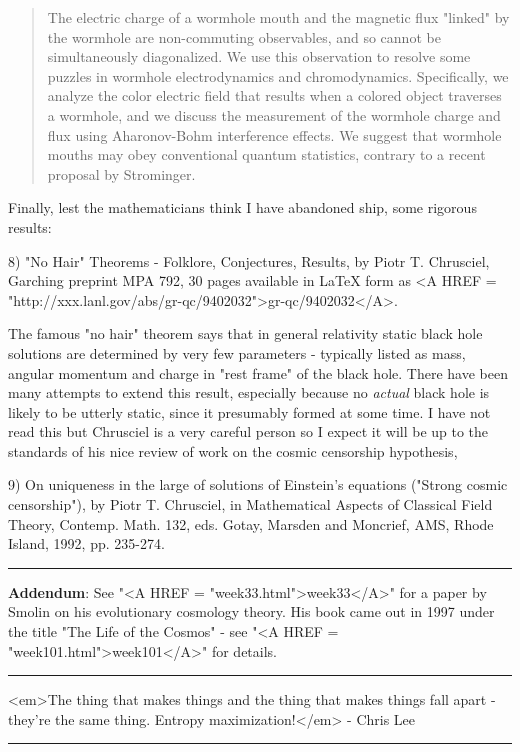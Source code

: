 \begin{quote}
The electric charge of a wormhole mouth and the magnetic flux 
"linked" by
the wormhole are non-commuting observables, and so cannot be simultaneously
diagonalized.  We use this observation to resolve some puzzles in wormhole
electrodynamics and chromodynamics.  Specifically, we analyze the color
electric field that results when a colored object traverses a wormhole, and
we discuss the measurement of the wormhole charge and flux using Aharonov-Bohm
interference effects.  We suggest that wormhole mouths may obey conventional
quantum statistics, contrary to a recent proposal by Strominger.
\end{quote}

Finally, lest the mathematicians think I have abandoned ship, some
rigorous results:

8) "No Hair" Theorems - Folklore, Conjectures, Results, by  Piotr T.
Chrusciel, Garching preprint MPA 792, 30 pages available in LaTeX form
as <A HREF = "http://xxx.lanl.gov/abs/gr-qc/9402032">gr-qc/9402032</A>. 

The famous "no hair" theorem says that in general relativity static
black hole solutions are determined by very few parameters - typically
listed as mass, angular momentum and charge in "rest frame" of the black
hole.  There have been many attempts to extend this result, especially
because no \emph{actual} black hole is likely to be utterly static, since it
presumably formed at some time.  I have not read this but Chrusciel is a
very careful person so I expect it will be up to the standards of his
nice review of work on the cosmic censorship hypothesis,

9) On uniqueness in the large of solutions of Einstein's equations
("Strong cosmic censorship"), by Piotr T. Chrusciel, in Mathematical
Aspects of Classical Field Theory, Contemp. Math. 132, eds. Gotay,
Marsden and Moncrief, AMS, Rhode Island, 1992, pp. 235-274.

\par\noindent\rule{\textwidth}{0.4pt}
\textbf{Addendum}: 
See "<A HREF = "week33.html">week33</A>" for a paper 
by Smolin on his evolutionary cosmology theory.
His book came out in 1997 under the title
"The Life of the Cosmos" - see 
"<A HREF = "week101.html">week101</A>" for details.

\par\noindent\rule{\textwidth}{0.4pt}
<em>The thing that makes things
and the thing that makes things fall apart - they're the same
thing.  Entropy maximization!</em> - Chris Lee

\par\noindent\rule{\textwidth}{0.4pt}

